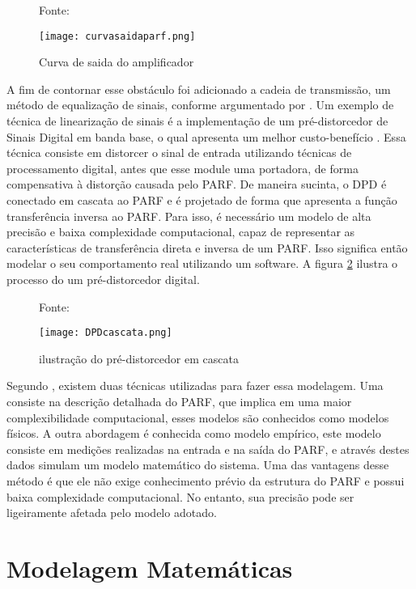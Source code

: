 \begin{figure}[ht!]
    \centering
    \captionsetup{justification=centering}
    \caption*{Fonte: \cite{Chavez2018}}
    \texttt{[image: curvasaidaparf.png]}
    \caption{Curva de saida do amplificador}
    \label{fig:saidaparf}
\end{figure}

A fim de contornar esse obstáculo foi adicionado a cadeia de transmissão, um método de equalização de sinais, conforme argumentado por \cite{Kenington2000}. Um exemplo de técnica de linearização de sinais é a implementação de um pré-distorcedor de Sinais Digital em banda base, o qual apresenta um melhor custo-benefício \cite{Kenington2000}. Essa técnica consiste em distorcer o sinal de entrada utilizando técnicas de processamento digital, antes que esse module uma portadora, de forma compensativa à distorção causada pelo PARF. De maneira sucinta, o DPD é conectado em cascata ao PARF e é projetado de forma que apresenta a função transferência inversa ao PARF. Para isso, é necessário um modelo de alta precisão e baixa complexidade computacional, capaz de representar as características de transferência direta e inversa de um PARF. Isso significa então modelar o seu comportamento real utilizando um software.  A figura \ref{fig:cascatadpd} ilustra o processo do um pré-distorcedor digital.

\begin{figure}[h!]
    \centering
    \captionsetup{justification=centering}
    \caption*{Fonte: \cite{Chavez2018}}
    \texttt{[image: DPDcascata.png]}
    \caption{ilustração do pré-distorcedor em cascata}
    \label{fig:cascatadpd}
\end{figure}

Segundo \cite{John2016}, existem duas técnicas utilizadas para fazer essa modelagem. Uma consiste na descrição detalhada do PARF, que implica em uma maior complexibilidade computacional, esses modelos são conhecidos como modelos físicos. A outra abordagem é conhecida como modelo empírico, este modelo consiste em medições realizadas na entrada e na saída do PARF, e através destes dados simulam um modelo matemático do sistema. Uma das vantagens desse método é que ele não exige conhecimento prévio da estrutura do PARF e possui baixa complexidade computacional. No entanto, sua precisão pode ser ligeiramente afetada pelo modelo adotado.
\section{Modelagem Matemáticas}

